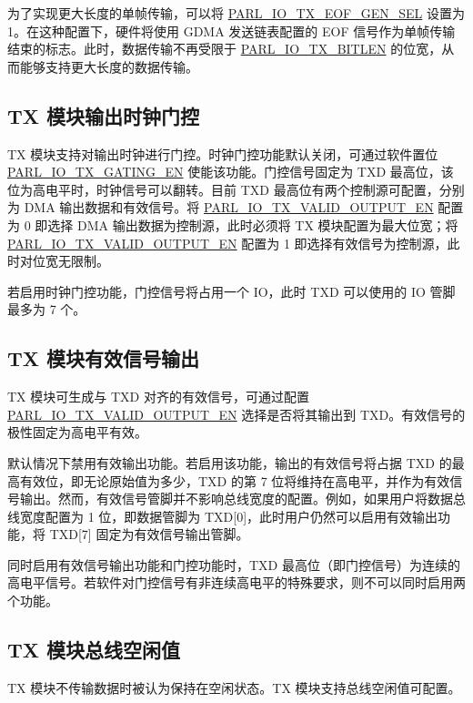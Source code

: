 \documentclass[main\_\_CN.tex]{subfiles}
\begin{document}
为了实现更大长度的单帧传输，可以将 \hyperref[fielddesc:PARLIOTXEOFGENSEL]{PARL\_IO\_TX\_EOF\_GEN\_SEL} 设置为 1。在这种配置下，硬件将使用 GDMA 发送链表配置的 EOF 信号作为单帧传输结束的标志。此时，数据传输不再受限于 \hyperref[fielddesc:PARLIOTXBITLEN]{PARL\_IO\_TX\_BITLEN} 的位宽，从而能够支持更大长度的数据传输。

\subsection{TX 模块输出时钟门控}

TX 模块支持对输出时钟进行门控。时钟门控功能默认关闭，可通过软件置位 \hyperref[fielddesc:PARLIOTXGATINGEN] {PARL\_IO\_TX\_GATING\_EN} 使能该功能。门控信号固定为 TXD 最高位，该位为高电平时，时钟信号可以翻转。目前 TXD 最高位有两个控制源可配置，分别为 DMA 输出数据和有效信号。将 \hyperref[fielddesc:PARLIOTXVALIDOUTPUTEN] {PARL\_IO\_TX\_VALID\_OUTPUT\_EN} 配置为 0 即选择 DMA 输出数据为控制源，此时必须将 TX 模块配置为最大位宽；将 \hyperref[fielddesc:PARLIOTXVALIDOUTPUTEN] {PARL\_IO\_TX\_VALID\_OUTPUT\_EN} 配置为 1 即选择有效信号为控制源，此时对位宽无限制。

若启用时钟门控功能，门控信号将占用一个 IO，此时 TXD 可以使用的 IO 管脚最多为 7 个。


\subsection{TX 模块有效信号输出}

TX 模块可生成与 TXD 对齐的有效信号，可通过配置 \hyperref[fielddesc:PARLIOTXVALIDOUTPUTEN]{PARL\_IO\_TX\_VALID\_OUTPUT\_EN} 选择是否将其输出到 TXD。有效信号的极性固定为高电平有效。

默认情况下禁用有效输出功能。若启用该功能，输出的有效信号将占据 TXD 的最高有效位，即无论原始值为多少，TXD 的第 7 位将维持在高电平，并作为有效信号输出。然而，有效信号管脚并不影响总线宽度的配置。例如，如果用户将数据总线宽度配置为 1 位，即数据管脚为 TXD[0]，此时用户仍然可以启用有效输出功能，将 TXD[7] 固定为有效信号输出管脚。

\begin{tiplisting}
同时启用有效信号输出功能和门控功能时，TXD 最高位（即门控信号）为连续的高电平信号。若软件对门控信号有非连续高电平的特殊要求，则不可以同时启用两个功能。
\end{tiplisting}


\subsection{TX 模块总线空闲值}
TX 模块不传输数据时被认为保持在空闲状态。TX 模块支持总线空闲值可配置。
\end{document}
